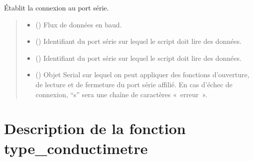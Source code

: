 \documentclass[letterpaper,10pt,french]{sphinxmanual}
\begin{document}
\begin{fulllineitems}
\label{\detokenize{Documentation:lib_conductimetre.port_connexion}}
\pysigstartsignatures
{}
\pysigstopsignatures
\sphinxAtStartPar
Établit la connexion au port série.
\begin{quote}\begin{description}
\begin{itemize}
\item {} 
\sphinxAtStartPar
{} () \textendash{} Flux de données en baud.

\item {} 
\sphinxAtStartPar
{} () \textendash{} Identifiant du port série sur lequel le script doit lire des données.

\end{itemize}

\sphinxAtStartPar
\begin{itemize}
\item {} 
\sphinxAtStartPar
{} () \textendash{} Identifiant du port série sur lequel le script doit lire des données.

\item {} 
\sphinxAtStartPar
{} () \textendash{} Objet Serial sur lequel on peut appliquer des fonctions d’ouverture, de lecture et de fermeture du port série affilié. En cas d’échec de connexion, “s” sera une chaîne de caractères « erreur ».

\end{itemize}


\end{description}\end{quote}

\end{fulllineitems}



\section{Description de la fonction type\_conductimetre}
\label{\detokenize{Documentation:description-de-la-fonction-type-conductimetre}}
\end{document}
